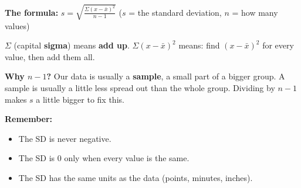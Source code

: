 \documentclass[11pt]{article}
\begin{document}
\vspace{0.8em}
\textbf{The formula:} \qquad
$\displaystyle s = \sqrt{\frac{\Sigma(x - \bar{x})^2}{n - 1}}$ \qquad ($s$ = the standard deviation, \; $n$ = how many values)

\vspace{0.3em}
$\Sigma$ (capital \textbf{sigma}) means \textbf{add up}. \; $\Sigma(x - \bar{x})^2$ means: find $(x - \bar{x})^2$ for every value, then add them all.

\vspace{0.6em}
\textbf{Why $n - 1$?} Our data is usually a \textbf{sample}, a small part of a bigger group.
A sample is usually a little less spread out than the whole group. Dividing by $n - 1$ makes $s$ a little bigger to fix this.

\vspace{0.6em}
\textbf{Remember:}
\begin{itemize}[itemsep=0pt,topsep=2pt]
  \item The SD is never negative.
  \item The SD is 0 only when every value is the same.
  \item The SD has the same units as the data (points, minutes, inches).
\end{itemize}

\partner
\end{document}
